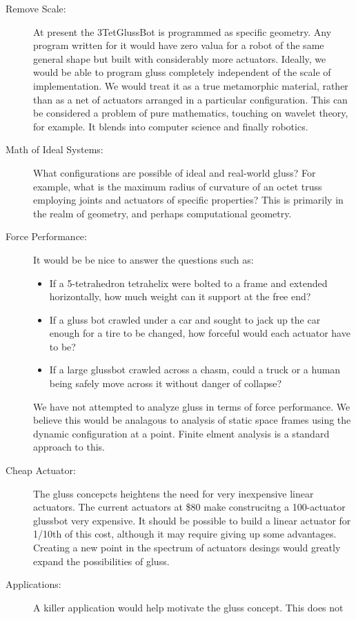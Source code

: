 \documentclass[12pt]{article}
\begin{document}
\begin{description}
\item [Remove Scale:] At present the 3TetGlussBot is programmed as specific geometry. Any program
  written for it would have zero valua for a robot of the same general shape but built with considerably
  more actuators. Ideally, we would be able to program gluss completely independent of the scale
  of implementation. We would treat it as a true metamorphic material, rather than as a net of
  actuators arranged in a particular configuration. This can be considered a problem of pure
  mathematics, touching on wavelet theory, for example. It blends into computer science and
  finally robotics.
\item [Math of Ideal Systems:] What configurations are possible of ideal and real-world gluss?
  For example, what is the maximum radius of curvature of an octet truss employing joints
  and actuators of specific properties? This is primarily in the realm of geometry, and perhaps
  computational geometry.
\item [Force Performance:]
It would be be nice to answer the questions such as:
\begin{itemize}  
\item If a 5-tetrahedron tetrahelix were bolted to a frame and extended horizontally, how much
  weight can it support at the free end?
\item If a gluss bot crawled under a car and sought to jack up the car enough for a tire
  to be changed, how forceful would each actuator have to be?
\item If a large glussbot crawled across a chasm, could a truck or a human being safely move
  across it without danger of collapse?
\end{itemize}
We have not attempted to analyze gluss in terms of force performance. We believe this would
be analagous to analysis of static space frames using the dynamic configuration at a point.
Finite elment analysis is a standard approach to this.
\item [Cheap Actuator:] The gluss concepcts heightens the need for very inexpensive linear
  actuators. The current actuators at \$80 make construcitng a 100-actuator glussbot very expensive.
  It should be possible to build a linear actuator for 1/10th of this cost, although it may require
  giving up some advantages. Creating a new point in the spectrum of actuators desings would greatly
  expand the possibilities of gluss.
\item [Applications:] A killer application would help motivate the gluss concept. This does not

\end{description}
\end{document}
